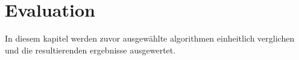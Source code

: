 \documentclass[main.tex]{subfiles}
\begin{document}

\chapter{Evaluation}

In diesem kapitel werden zuvor ausgewählte algorithmen einheitlich verglichen und die resultierenden ergebnisse ausgewertet.
\end{document}
